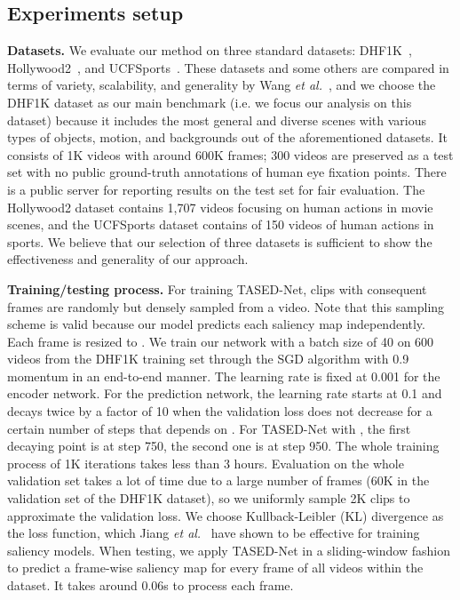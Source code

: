 \documentclass[10pt,twocolumn,letterpaper]{article}
\newcommand{\modelname}{TASED-Net}
\begin{document}
\subsection{Experiments setup} \label{subsec:training}
\textbf{Datasets.} We evaluate our method on three standard datasets: DHF1K~\cite{wang2018revisiting}, Hollywood2~\cite{marszalek2009actions, mathe2015actions}, and UCFSports~\cite{mathe2015actions, rodriguez2008action, soomro2014action}. These datasets and some others are compared in terms of variety, scalability, and generality by Wang \textit{et al.}~\cite{wang2018revisiting}, and we choose the DHF1K dataset as our main benchmark (i.e. we focus our analysis on this dataset) because it includes the most general and diverse scenes with various types of objects, motion, and backgrounds out of the aforementioned datasets. It consists of 1K videos with around 600K frames; 300 videos are preserved as a test set with no public ground-truth annotations of human eye fixation points. There is a public server for reporting results on the test set for fair evaluation. The Hollywood2 dataset contains 1,707 videos focusing on human actions in movie scenes, and the UCFSports dataset contains of 150 videos of human actions in sports. We believe that our selection of three datasets is sufficient to show the effectiveness and generality of our approach.

\textbf{Training/testing process.} For training \modelname{}, clips with  consequent frames are randomly but densely sampled from a video. Note that this sampling scheme is valid because our model predicts each saliency map independently. Each frame is resized to . We train our network with a batch size of 40 on 600 videos from the DHF1K training set through the SGD algorithm with 0.9 momentum in an end-to-end manner. The learning rate is fixed at 0.001 for the encoder network. For the prediction network, the learning rate starts at 0.1 and decays twice by a factor of 10 when the validation loss does not decrease for a certain number of steps that depends on . For \modelname{} with , the first decaying point is at step 750, the second one is at step 950. The whole training process of 1K iterations takes less than 3 hours. Evaluation on the whole validation set takes a lot of time due to a large number of frames (60K in the validation set of the DHF1K dataset), so we uniformly sample 2K clips to approximate the validation loss. We choose Kullback-Leibler (KL) divergence as the loss function, which Jiang \textit{et al.}~\cite{jiang2015salicon} have shown to be effective for training saliency models. When testing, we apply \modelname{} in a sliding-window fashion to predict a frame-wise saliency map for every frame of all videos within the dataset. It takes around 0.06s to process each frame.
\end{document}
